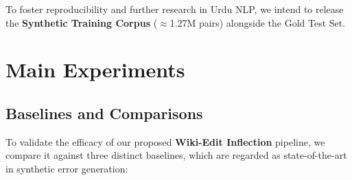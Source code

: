 \documentclass[11pt]{article}
\begin{document}
To foster reproducibility and further research in Urdu NLP, we intend to release the \textbf{Synthetic Training Corpus} ($\approx$1.27M pairs) alongside the Gold Test Set.


\section{Main Experiments}
\label{sec:Main_Experiments}

\subsection{Baselines and Comparisons}
To validate the efficacy of our proposed \textbf{Wiki-Edit Inflection} pipeline, we compare it against three distinct baselines, which are regarded as state-of-the-art in synthetic error generation:
\end{document}
